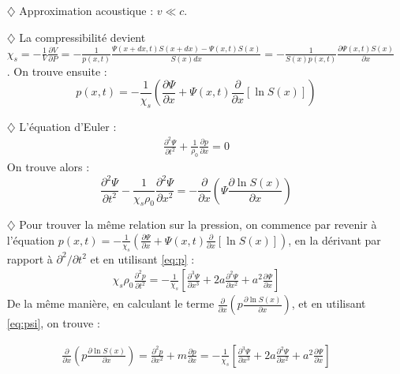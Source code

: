 \documentclass{report}
\begin{document}
\begin{itemize}

\item[$\diamondsuit$] Approximation acoustique : $v\ll c$.

\item[$\diamondsuit$] La compressibilité devient $\chi_s=-\frac{1}{V}\frac{\partial V}{\partial P}=-\frac{1}{p(x,t)}\frac{\Psi(x+dx,t)S(x+dx)-\Psi(x,t)S(x)}{S(x)dx}=-\frac{1}{S(x)p(x,t)}\frac{\partial \Psi(x,t)S(x)}{\partial x}$. On trouve ensuite :
\begin{equation}
	p(x,t) = -\frac{1}{\chi_s}\left(\frac{\partial \Psi}{\partial x}+\Psi(x,t)\frac{\partial }{\partial x}\left[\ln S(x) \right]  \right)
	\label{eq:p}
\end{equation}

\item[$\diamondsuit$] L'équation d'Euler :
\begin{align*}
	\frac{\partial^2\Psi}{\partial t^2}+\frac{1}{\rho_0}\frac{\partial p}{\partial x}=0
\end{align*}
On trouve alors :
\begin{equation}
	\frac{\partial^2\Psi}{\partial t^2}-\frac{1}{\chi_s\rho_0}\frac{\partial^2 \Psi}{\partial x^2}=-\frac{\partial}{\partial x}\left(\Psi \frac{\partial \ln S(x)}{\partial x} \right) 
	\label{eq:psi}
\end{equation}

\item[$\diamondsuit$] Pour trouver la même relation sur la pression, on commence par revenir à l'équation $p(x,t) = -\frac{1}{\chi_s}\left(\frac{\partial \Psi}{\partial x}+\Psi(x,t)\frac{\partial }{\partial x}\left[\ln S(x) \right]  \right)$, en la dérivant par rapport à $\partial^2/\partial t^2$ et en utilisant \ref{eq:p} :
\begin{align*}
	\chi_s\rho_0\frac{\partial^2p}{\partial t^2}=-\frac{1}{\chi_s}\left[ \frac{\partial^3 \Psi}{\partial x^3}+2a\frac{\partial^2 \Psi}{\partial x^2}+a^2\frac{\partial \Psi}{\partial x}\right]
\end{align*}
De la même manière, en calculant le terme $\frac{\partial}{\partial x}\left(p \frac{\partial \ln S(x)}{\partial x} \right)$, et en utilisant \ref{eq:psi}, on trouve :

\begin{align*}
	\frac{\partial}{\partial x}\left(p \frac{\partial \ln S(x)}{\partial x} \right) = \frac{\partial^2 p}{\partial x^2}+m\frac{\partial p}{\partial x}=-\frac{1}{\chi_s}\left[ \frac{\partial^3 \Psi}{\partial x^3}+2a\frac{\partial^2 \Psi}{\partial x^2}+a^2\frac{\partial \Psi}{\partial x}\right]
\end{align*}


\end{itemize}
\end{document}
